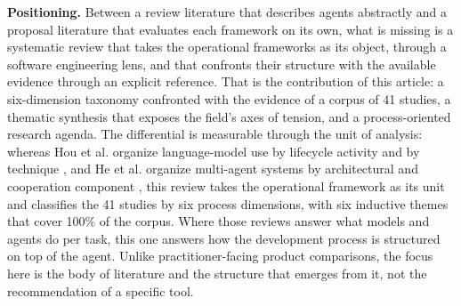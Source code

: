 \noindent\textbf{Positioning.} Between a review literature that describes agents abstractly and a proposal literature that evaluates each framework on its own, what is missing is a systematic review that takes the operational frameworks as its object, through a software engineering lens, and that confronts their structure with the available evidence through an explicit reference. That is the contribution of this article: a six-dimension taxonomy confronted with the evidence of a corpus of 41 studies, a thematic synthesis that exposes the field's axes of tension, and a process-oriented research agenda. The differential is measurable through the unit of analysis: whereas Hou et al. organize language-model use by lifecycle activity and by technique \cite{hou2024llmse}, and He et al. organize multi-agent systems by architectural and cooperation component \cite{JundaHe2025}, this review takes the operational framework as its unit and classifies the 41 studies by six process dimensions, with six inductive themes that cover 100\% of the corpus. Where those reviews answer what models and agents do per task, this one answers how the development process is structured on top of the agent. Unlike practitioner-facing product comparisons, the focus here is the body of literature and the structure that emerges from it, not the recommendation of a specific tool.
